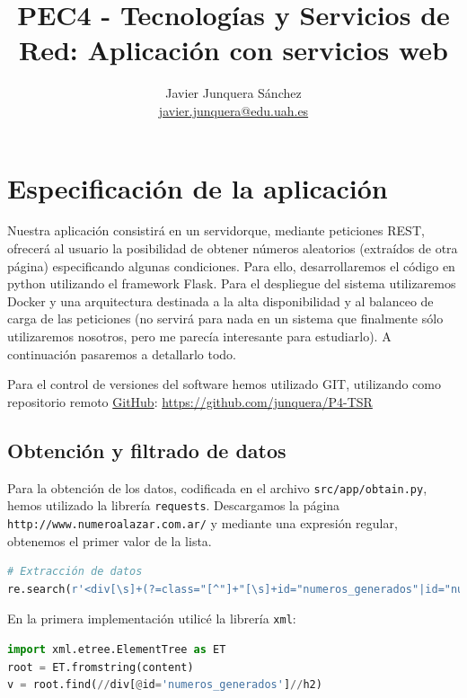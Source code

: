 \documentclass{article}
\title{PEC4 - Tecnologías y Servicios de Red: Aplicación con servicios web}
\author{Javier Junquera Sánchez \\ \href{mailto:javier.junquera@edu.uah.es}{javier.junquera@edu.uah.es}}
\begin{document}
\maketitle

\section{Especificación de la aplicación}

Nuestra aplicación consistirá en un servidorque, mediante peticiones REST, ofrecerá al usuario la posibilidad de obtener números aleatorios (extraídos de otra página) especificando algunas condiciones. Para ello, desarrollaremos el código en python utilizando el framework Flask. Para el despliegue del sistema utilizaremos Docker y una arquitectura destinada a la alta disponibilidad y al balanceo de carga de las peticiones (no servirá para nada en un sistema que finalmente sólo utilizaremos nosotros, pero me parecía interesante para estudiarlo). A continuación pasaremos a detallarlo todo.


Para el control de versiones del software hemos utilizado GIT, utilizando como repositorio remoto \href{https://github.com}{GitHub}: \href{https://github.com/junquera/P4-TSR}{https://github.com/junquera/P4-TSR}

\subsection{Obtención y filtrado de datos}

Para la obtención de los datos, codificada en el archivo \texttt{src/app/obtain.py}, hemos utilizado la librería \texttt{requests}. Descargamos la página \texttt{http://www.numeroalazar.com.ar/} y mediante una expresión regular, obtenemos el primer valor de la lista.

\begin{lstlisting}[language=Python]
# Extracción de datos
re.search(r'<div[\s]+(?=class="[^"]+"[\s]+id="numeros_generados"|id="numeros_generados"[\s]+class="[^"]+")[^>]*>.+?<h2>[^\<]+<\/h2>(.+?)<\/div>',content, flags=re.MULTILINE|re.DOTALL)
\end{lstlisting}

En la primera implementación utilicé la librería \texttt{xml}:

\begin{lstlisting}[language=python]
import xml.etree.ElementTree as ET
root = ET.fromstring(content)
v = root.find(//div[@id='numeros_generados']//h2)
\end{lstlisting}
\end{document}
